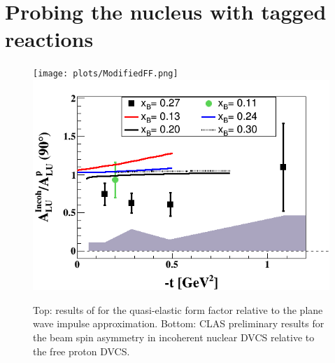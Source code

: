 \section{Probing the nucleus with tagged reactions} 

\begin{figure}[tbp]
\centering\texttt{[image: plots/ModifiedFF.png]} \\
\centering\includegraphics[width=\columnwidth]{plots/ALU_ratioInc_t_shortscenrario-without-error-onX.png}
\caption{Top: results of \cite{Strauch:2002wu} for the quasi-elastic form factor relative to
the plane wave impulse approximation. Bottom: CLAS preliminary results 
for the beam spin asymmetry in incoherent nuclear DVCS relative to the free proton DVCS.}
\label{fig:QEincoh}
\end{figure}

